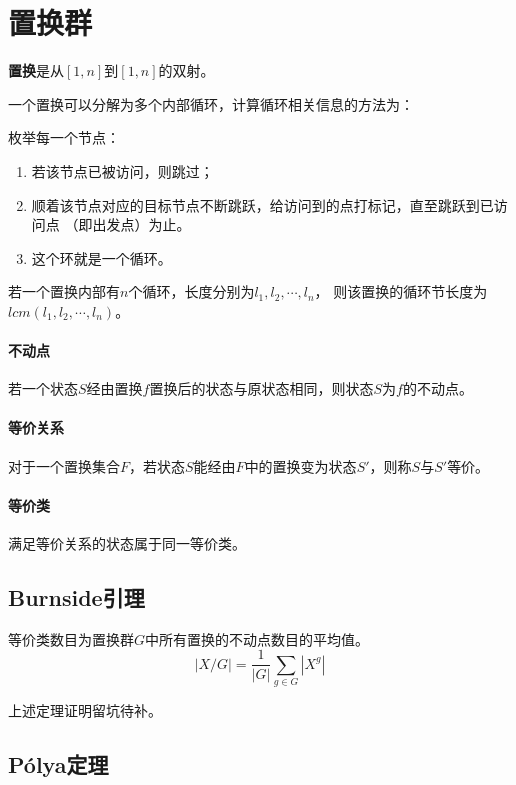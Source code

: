 \section{置换群}
{\bfseries 置换}是从$[1,n]$到$[1,n]$的双射。

一个置换可以分解为多个内部循环，计算循环相关信息的方法为：

枚举每一个节点：
\begin{enumerate}
	\item 若该节点已被访问，则跳过；
	\item 顺着该节点对应的目标节点不断跳跃，给访问到的点打标记，直至跳跃到已访问点
	      （即出发点）为止。
	\item 这个环就是一个循环。
\end{enumerate}
\begin{theorem}
	若一个置换内部有$n$个循环，长度分别为$l_1,l_2,\cdots,l_n$，
	则该置换的循环节长度为$lcm(l_1,l_2,\cdots,l_n)$。
\end{theorem}
\paragraph{不动点}
若一个状态$S$经由置换$f$置换后的状态与原状态相同，则状态$S$为$f$的不动点。
\paragraph{等价关系}
对于一个置换集合$F$，若状态$S$能经由$F$中的置换变为状态$S'$，则称$S$与$S'$等价。
\paragraph{等价类}
满足等价关系的状态属于同一等价类。

\subsection{Burnside引理}
\begin{lemma}
	等价类数目为置换群$G$中所有置换的不动点数目的平均值。
	\begin{displaymath}
		|X/G|=\frac{1}{|G|}\sum_{g\in G}|X^g|
	\end{displaymath}
\end{lemma}
上述定理证明留坑待补。
\subsection{Pólya定理}

